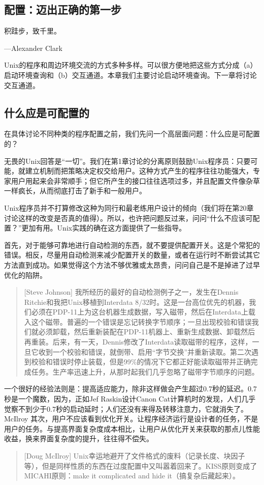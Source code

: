 \documentclass[12pt,oneside]{book}
\begin{document}
\begin{common-format}
\chapter{配置：迈出正确的第一步}
\begin{flushright}
\begin{notecard}{12em}
积跬步，致千里。

{\hfill —Alexander Clark}
\end{notecard}
\end{flushright}

Unix的程序和周边环境交流的方式多种多样。可以很方便地把这些方式分成（a）启动环境查询和（b）交互通道。本章我们主要讨论启动环境查询。下一章将讨论交互通道。

\section{什么应是可配置的}
在具体讨论不同种类的程序配置之前，我们先问一个高层面问题：什么应是可配置的？

无畏的Unix回答是“一切”。我们在第1章讨论的分离原则鼓励Unix程序员：只要可能，就建立机制而把策略决定权交给用户。这种方式产生的程序往往功能强大，专家用户用起来会非常顺手；但它所产生的接口往往选项过多，并且配置文件像杂草一样疯长，从而彻底打击了新手和一般用户。

Unix程序员并不打算修改这种为同行和最老练用户设计的倾向（我们将在第20章讨论这样的改变是否真的值得）。所以，也许把问题反过来，问问“什么不应该可配置？”更加有用。Unix实践的确在这方面提供了一些指导。

首先，对于能够可靠地进行自动检测的东西，就不要提供配置开关。这是个常犯的错误。相反，尽量用自动检测来减少配置开关的数量，或者在运行时不断尝试其它方法直到成功。如果觉得这个方法不够优雅或太昂贵，问问自己是不是掉进了过早优化的陷阱。

\begin{quote}[Steve Johnson]
我所经历的最好的自动检测例子之一，发生在Dennis Ritchie和我把Unix移植到Interdata 8/32时。这是一台高位优先的机器，我们必须在PDP-11上为这台机器生成数据，写入磁带，然后在Interdata上载入这个磁带。普遍的一个错误是忘记转换字节顺序；一旦出现校验和错误我们就必须卸载，然后重新装配在PDP-11机器上、重新生成数据、卸载然后再重装。后来，有一天，Dennis修改了Interdata读取磁带的程序，这样，一旦它收到一个校验和错误，就倒带、启用“字节交换”并重新读取。第二次遇到校验和错误时停止装载，但是99\%{}的情况下它都正好能读取磁带并正确完成任务。生产率迅速上升，从那时起我们几乎忽略了磁带字节顺序的问题。
\end{quote}

一个很好的经验法则是：提高适应能力，除非这样做会产生超过0.7秒的延迟。0.7秒是一个魔数，因为，正如Jef Raskin设计Canon Cat计算机时的发现，人们几乎觉察不到少于0.7秒的启动延时；人们还没有来得及转移注意力，它就消失了。
McIlroy
其次，用户不应该看到优化开关。让程序经济运行是设计者的任务，不是用户的任务。与提高界面复杂度成本相比，让用户从优化开关来获取的那点儿性能收益，换来界面复杂度的提升，往往得不偿失。
\begin{quote}[Doug McIlroy]
Unix幸运地避开了文件格式的废料（记录长度、块因子等），但是同样性质的东西在过度配置中又叫嚣着回来了。KISS原则变成了MICAHI原则：make it complicated and hide it（搞复杂后藏起来）。
\end{quote}


\end{common-format}
\end{document}
